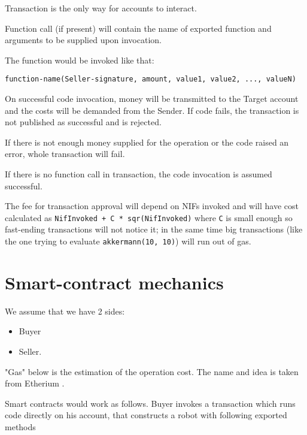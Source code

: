 \documentclass[a4paper]{article}
\begin{document}
Transaction is the only way for accounts to interact.

Function call (if present) will contain the name of exported function and arguments to be supplied upon invocation.

The function would be invoked like that:

\begin{verbatim}
function-name(Seller-signature, amount, value1, value2, ..., valueN)
\end{verbatim}

On successful code invocation, money will be transmitted to the Target account and the costs will be demanded from the Sender.
If code fails, the transaction is not published as successful and is rejected.

If there is not enough money supplied for the operation or the code raised an error, whole transaction will fail.

If there is no function call in transaction, the code invocation is assumed successful.

The fee for transaction approval will depend on NIFs invoked and will have cost calculated as \verb|NifInvoked + C * sqr(NifInvoked)| where \verb|C| is small enough so fast-ending transactions will not notice it; in the same time big transactions (like the one trying to evaluate \verb|akkermann(10, 10)|) will run out of gas.

\section*{Smart-contract mechanics}

We assume that we have 2 sides:
\begin{itemize}
  \item Buyer
  \item Seller.
\end{itemize}

"Gas" below is the estimation of the operation cost. The name and idea is taken from Etherium \cite{eth}.

Smart contracts would work as follows. Buyer invokes a transaction which runs code directly on his account, that constructs a robot with following exported methods
\end{document}
